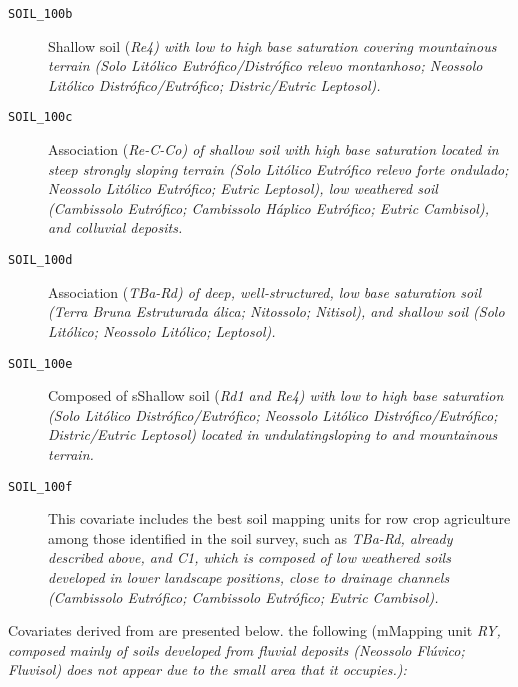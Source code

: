 \begin{description}
 \item[\tt{SOIL\_100b}] Shallow soil (\it{Re4}) with low to high base saturation covering mountainous 
 terrain (Solo Litólico Eutrófico/Distrófico relevo montanhoso; Neossolo Litólico Distrófico/Eutrófico;
 Distric/Eutric Leptosol).
  
 \item[\tt{SOIL\_100c}] Association (\it{Re-C-Co}) of shallow soil with high base saturation located in
steep strongly sloping terrain (Solo Litólico Eutrófico relevo forte ondulado; Neossolo Litólico Eutrófico; 
Eutric
 Leptosol), low weathered soil (Cambissolo Eutrófico; Cambissolo Háplico Eutrófico; Eutric Cambisol), and
 colluvial deposits.
  
 \item[\tt{SOIL\_100d}] Association (\it{TBa-Rd}) of deep, well-structured, low base saturation soil (Terra
 Bruna Estruturada álica; Nitossolo; Nitisol), and shallow soil (Solo Litólico; Neossolo Litólico; Leptosol).
  
 \item[\tt{SOIL\_100e}] Composed of sShallow soil (\it{Rd1} and \textit{Re4}) with low to high base
 saturation (Solo Litólico Distrófico/Eutrófico; Neossolo Litólico Distrófico/Eutrófico; Distric/Eutric
 Leptosol) located in undulatingsloping to and mountainous terrain.
  
 \item[\tt{SOIL\_100f}] This covariate includes the best soil mapping units for row crop agriculture among 
those 
 identified in the soil survey, such as \it{TBa-Rd}, already described above, and \it{C1}, which is composed
 of low weathered soils developed in lower landscape positions, close to drainage channels (Cambissolo
 Eutrófico; Cambissolo Eutrófico; Eutric Cambisol).
\end{description}

Covariates derived from \soilNew{} are presented below. the following (mMapping unit \it{RY}, composed mainly 
of soils developed 
from fluvial deposits (Neossolo Flúvico; Fluvisol) does not appear due to the small area that it occupies.):

